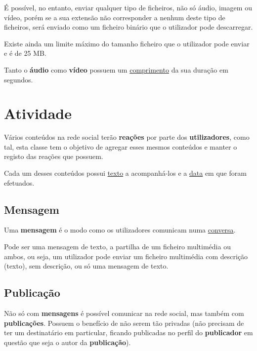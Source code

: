 \documentclass{report}
\begin{document}
É possível, no entanto, enviar qualquer tipo de ficheiros, não só áudio, imagem ou vídeo, porém se a sua extensão não corresponder a nenhum deste tipo de ficheiros, será enviado como um ficheiro binário que o utilizador pode descarregar. \par

Existe ainda um limite máximo do tamanho ficheiro que o utilizador pode enviar e é de 25 MB. \par

Tanto o \textbf{áudio} como \textbf{vídeo} possuem um \underline{comprimento} da sua duração em segundos.

\section{Atividade}

Vários conteúdos na rede social terão \textbf{reações} por parte dos \textbf{utilizadores}, como tal, esta classe tem o objetivo de agregar esses mesmos conteúdos e manter o registo das reações que possuem. \par

Cada um desses conteúdos possui \underline{texto} a acompanhá-los e a \underline{data} em que foram efetuados.

\subsection{Mensagem}

Uma \textbf{mensagem} é o modo como os utilizadores comunicam numa \underline{conversa}. \par

Pode ser uma mensagem de texto, a partilha de um ficheiro multimédia ou ambos, ou seja, um utilizador pode enviar um ficheiro multimédia com descrição (texto), sem descrição, ou só uma mensagem de texto. \par

\subsection{Publicação}

Não só com \textbf{mensagens} é possível comunicar na rede social, mas também com \textbf{publicações}. Possuem o benefício de não serem tão privadas (não precisam de ter um destinatário em particular, ficando publicadas no perfil do \textbf{publicador} em questão que seja o autor da \textbf{publicação}). \par
\end{document}
